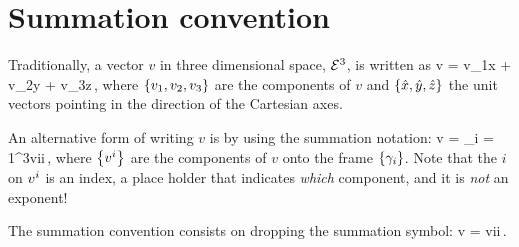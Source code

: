 \section{Summation convention}
Traditionally, a vector $v$ in three dimensional space, $\mathcal{\mathcal{E}}^{3}$, is written as
\beq
v = v_1\hat x + v_2\hat y + v_3\hat z\,,
\eeq
where $\left\lbrace{v_1, v_2, v_3}\right\rbrace$ are the components of $v$ and $\left\lbrace{\hat x, \hat y, \hat z}\right\rbrace$ the unit vectors pointing in the direction of the Cartesian axes.

An alternative form of writing $v$ is by using the summation notation:
\beq
v = \sum_{i = 1}^{3}\fvec vi\fbvec i\,,
\eeq
where $\left\lbrace{{v}^{i}}\right\rbrace$ are the components of $v$ onto the frame $\left\lbrace{\gamma_{i}}\right\rbrace$. Note that the $i$ on ${v}^{i}$ is an index, a place holder that indicates \emph{which} component, and it is \emph{not} an exponent!

The summation convention consists on dropping the summation symbol:
\beq
v = \fvec vi\fbvec i\,.\mqed
\eeq
